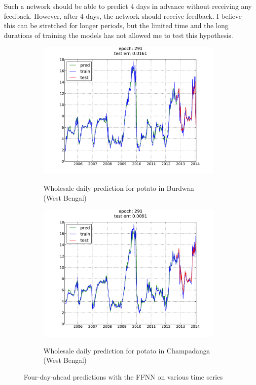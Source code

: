 Such a network should be able to predict 4 days in advance without receiving
any feedback. However, after 4 days, the network should receive feedback. I
believe this can be stretched for longer periods, but the limited time and the
long durations of training the models has not allowed me to test this
hypothesis.

\begin{figure}[H]
    \centering
        \begin{subfigure}[b]{.45\linewidth}
        \centering
        \includegraphics[width=\textwidth]{img/ffnn/5.pdf}
        \label{subfig:ffnn_pred_5}
        \caption{Wholesale daily prediction for potato in Burdwan (West Bengal)}
        \end{subfigure}
        \begin{subfigure}[b]{.45\linewidth}
        \centering
        \includegraphics[width=\textwidth]{img/ffnn/6.pdf}
        \label{subfig:ffnn_pred_6}
        \caption{Wholesale daily prediction for potato in Champadanga (West Bengal)}
        \end{subfigure}
    \caption{Four-day-ahead predictions with the FFNN on various time series}
\end{figure}


